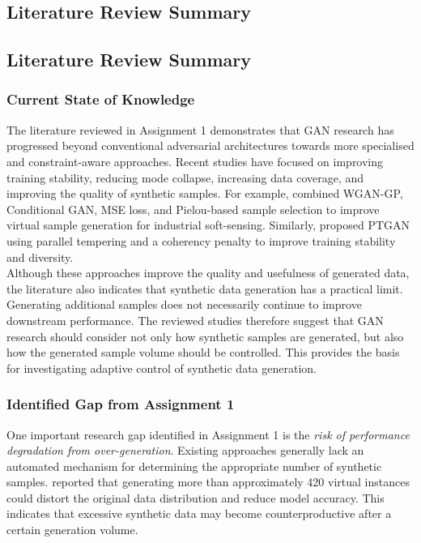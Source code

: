 \documentclass[12pt,a4paper]{report}
\begin{document}
\begin{justify}
\chapter{Literature Review Summary}
\section{Literature Review Summary}

\subsection{Current State of Knowledge}

The literature reviewed in Assignment 1 demonstrates that GAN research has progressed beyond conventional adversarial architectures towards more specialised and constraint-aware approaches. Recent studies have focused on improving training stability, reducing mode collapse, increasing data coverage, and improving the quality of synthetic samples. For example, \textcite{zhu2025novel} combined WGAN-GP, Conditional GAN, MSE loss, and Pielou-based sample selection to improve virtual sample generation for industrial soft-sensing. Similarly, \textcite{sohn2026parallelly} proposed PTGAN using parallel tempering and a coherency penalty to improve training stability and diversity. \\

Although these approaches improve the quality and usefulness of generated data, the literature also indicates that synthetic data generation has a practical limit. Generating additional samples does not necessarily continue to improve downstream performance. The reviewed studies therefore suggest that GAN research should consider not only how synthetic samples are generated, but also how the generated sample volume should be controlled. This provides the basis for investigating adaptive control of synthetic data generation.

\subsection{Identified Gap from Assignment 1}

One important research gap identified in Assignment 1 is the \textit{risk of performance degradation from over-generation}. Existing approaches generally lack an automated mechanism for determining the appropriate number of synthetic samples. \textcite{zhu2025novel} reported that generating more than approximately 420 virtual instances could distort the original data distribution and reduce model accuracy. This indicates that excessive synthetic data may become counterproductive after a certain generation volume. \\


\end{justify}
\end{document}
